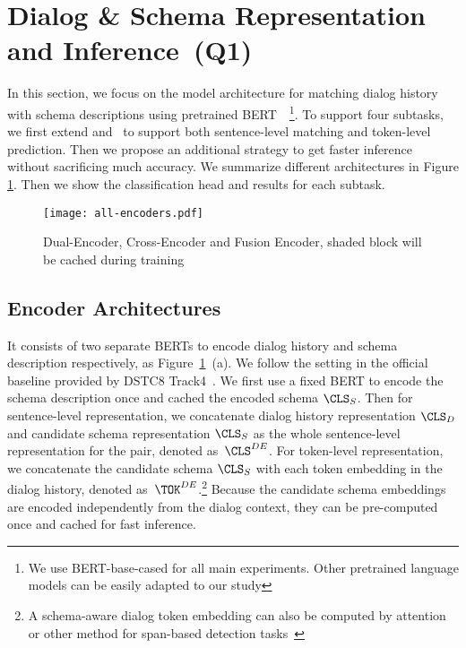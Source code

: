 \section{Dialog \& Schema Representation and Inference~(Q1)}
\label{sec:sgd:models}
In this section, we focus on the model architecture for matching
dialog history with schema descriptions using pretrained
BERT~\cite{devlin2019bert}~\footnote{We use BERT-base-cased for all
  main experiments. Other pretrained language models can be easily adapted to our study}. To support four subtasks,
we first extend \DE and \CE~to support both sentence-level matching and token-level
prediction. Then we propose an additional \FE strategy to get faster
inference without sacrificing much accuracy. We summarize different
architectures in Figure \ref{fig:encoders}. Then we show the
classification head and results for each subtask.

\begin{figure}[!t]
\centering
  \texttt{[image: all-encoders.pdf]}
  \caption{\label{fig:encoders} Dual-Encoder, Cross-Encoder and Fusion Encoder, shaded block will be cached during training}
\end{figure}

\subsection{Encoder Architectures}
\label{ssec:encoder-arch}
 It consists of two separate BERTs to encode
dialog history and schema description respectively, as
Figure~\ref{fig:encoders}~(a). We follow the setting in the official
baseline provided by DSTC8 Track4~\cite{rastogi2020schema}. We first
use a fixed BERT to encode the schema description once and cached the
encoded schema $\CLS_{S}$. Then for sentence-level representation, we
concatenate dialog history representation $\CLS_{D}$ and candidate
schema representation $\CLS_{S}$ as the whole sentence-level
representation for the pair, denoted as~${\CLS^{DE}}$.  For
token-level representation, we concatenate the candidate schema
$\CLS_{S}$ with each token embedding in the dialog history, denoted
as~${\TOK^{DE}}$.\footnote{A schema-aware dialog token embedding can
  also be computed by attention or other method for span-based
  detection tasks~\cite{humeau2019poly, noroozi2020fast}} Because
the candidate schema embeddings are encoded independently from the
dialog context, they can be pre-computed once and cached for fast
inference.

